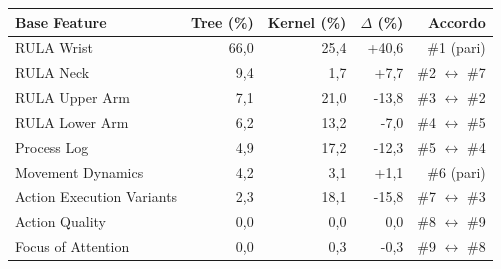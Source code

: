\begin{tabular*}{\linewidth}{@{}l@{\extracolsep{\fill}}rrrr@{}}
\toprule
\textbf{Base Feature} & \textbf{Tree (\%)} & \textbf{Kernel (\%)} & \textbf{$\Delta$ (\%)} & \textbf{Accordo} \\
\midrule
RULA Wrist & 66{,}0 & 25{,}4 & +40{,}6 & \#1 (pari) \\
RULA Neck & 9{,}4 & 1{,}7 & +7{,}7 & \#2 $\leftrightarrow$ \#7 \\
RULA Upper Arm & 7{,}1 & 21{,}0 & -13{,}8 & \#3 $\leftrightarrow$ \#2 \\
RULA Lower Arm & 6{,}2 & 13{,}2 & -7{,}0 & \#4 $\leftrightarrow$ \#5 \\
Process Log & 4{,}9 & 17{,}2 & -12{,}3 & \#5 $\leftrightarrow$ \#4 \\
Movement Dynamics & 4{,}2 & 3{,}1 & +1{,}1 & \#6 (pari) \\
Action Execution Variants & 2{,}3 & 18{,}1 & -15{,}8 & \#7 $\leftrightarrow$ \#3 \\
Action Quality & 0{,}0 & 0{,}0 & 0{,}0 & \#8 $\leftrightarrow$ \#9 \\
Focus of Attention & 0{,}0 & 0{,}3 & -0{,}3 & \#9 $\leftrightarrow$ \#8 \\
\bottomrule
\end{tabular*}
